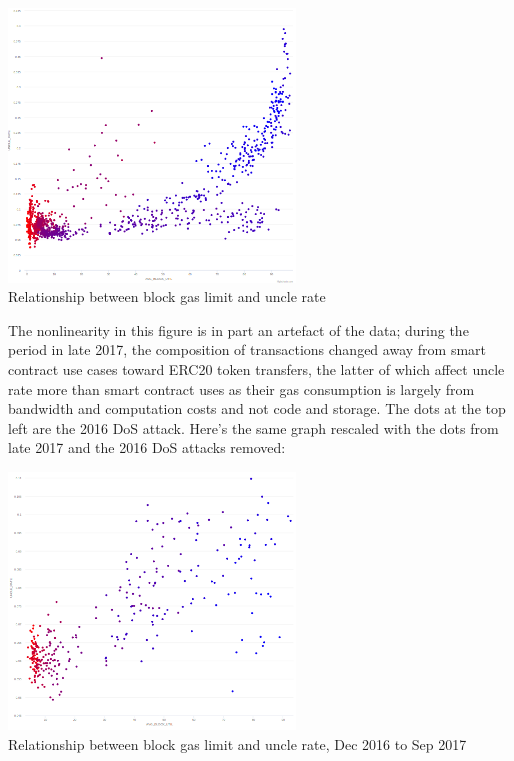 \documentclass[12pt, final]{article}
\begin{document}
\begin{center}
\includegraphics[width=3in]{etherchain_correlation.png} \\
\footnotesize{Relationship between block gas limit and uncle rate}
\label{fig:three}
\end{center}

The nonlinearity in this figure is in part an artefact of the data; during the period in late 2017, the composition of transactions changed away from smart contract use cases toward ERC20 token transfers, the latter of which affect uncle rate more than smart contract uses as their gas consumption is largely from bandwidth and computation costs and not code and storage. The dots at the top left are the 2016 DoS attack. Here's the same graph rescaled with the dots from late 2017 and the 2016 DoS attacks removed:

\begin{center}
\includegraphics[width=3in]{etherchain_correlation_2.png} \\
\footnotesize{Relationship between block gas limit and uncle rate, Dec 2016 to Sep 2017}
\label{fig:three}
\end{center}
\end{document}
